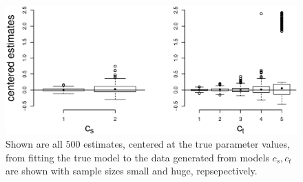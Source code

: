 \begin{figure}
  \centering
  \includegraphics[scale=0.5]{em_bp}
  \caption{Shown are all $500$ estimates, centered at the true parameter values, from fitting the true model to the data generated from models $c_s,c_t$ are shown with sample sizes small and huge, repsepectively.}
  \label{fig:em_bp}
\end{figure}



